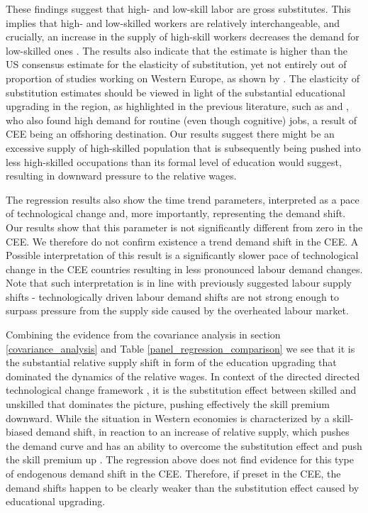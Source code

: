 \documentclass[11pt]{article}
\begin{document}
These findings suggest that high- and low-skill labor are gross substitutes. This implies that high- and low-skilled workers are relatively interchangeable, and crucially, an increase in the supply of high-skill workers decreases the demand for low-skilled ones \citep{havranek2020elasticity}. The results also indicate that the estimate is higher than the US consensus estimate for the elasticity of substitution, yet not entirely out of proportion of studies working on Western Europe, as shown by \cite{havranek2020elasticity}. The elasticity of substitution estimates should be viewed in light of the substantial educational upgrading in the region, as highlighted in the previous literature, such as \citet{arendt2019technical} and \citet{hardy2018educational}, who also found high demand for routine (even though cognitive) jobs, a result of CEE being an offshoring destination. Our results suggest there might be an excessive supply of high-skilled population that is subsequently being pushed into less high-skilled occupations than its formal level of education would suggest, resulting in downward pressure to the relative wages.

The regression results also show the time trend parameters, interpreted as a pace of technological change and, more importantly, representing the demand shift. Our results show that this parameter is not significantly different from zero in the CEE. We therefore do not confirm existence a trend demand shift in the CEE. A Possible interpretation of this result is a significantly slower pace of technological change in the CEE countries resulting in less pronounced labour demand changes. Note that such interpretation is in line with previously suggested labour supply shifts - technologically driven labour demand shifts are not strong enough to surpass pressure from the supply side caused by the overheated labour market.


Combining the evidence from the covariance analysis in section \ref{covariance_analysis} and Table \ref{panel_regression_comparison} we see that  it is the substantial relative supply shift in form of the education upgrading that dominated the dynamics of the relative wages. In context of the directed directed technological change framework \citep{acemoglu2002directed}, it is the substitution effect between skilled and unskilled that dominates the picture, pushing effectively the skill premium downward. While the situation in Western economies is characterized by a skill-biased demand shift, in reaction to an increase of relative supply, which pushes the demand curve and has an ability to overcome the substitution effect and push the skill premium up \citep{acemoglu2002directed}. The regression above does not find evidence for this type of endogenous demand shift in the CEE. Therefore, if preset in the CEE, the demand shifts happen to be clearly weaker than the substitution effect caused by educational upgrading.
\end{document}
